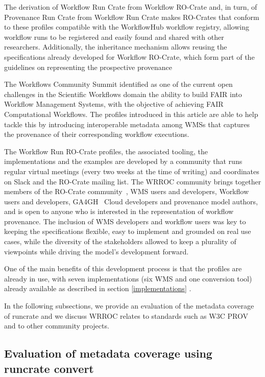 \documentclass[10pt,letterpaper]{article}
\begin{document}
The derivation of Workflow Run Crate from Workflow RO-Crate and, in turn, of Provenance Run Crate from Workflow Run Crate makes RO-Crates that conform to these profiles compatible with the WorkflowHub workflow registry, allowing workflow runs to be registered and easily found and shared with other researchers. Additionally, the inheritance mechanism allows reusing the specifications already developed for Workflow RO-Crate, which form part of the guidelines on representing the prospective provenance

The Workflows Community Summit \cite{Ferreira 2023} identified as one of the current open challenges in the Scientific Workflows domain the ability to build FAIR into Workflow Management Systems, with the objective of achieving FAIR Computational Workflows. The profiles introduced in this article are able to help tackle this by introducing interoperable metadata among WMSs that captures the provenance of their corresponding workflow executions.

The Workflow Run RO-Crate profiles, the associated tooling, the implementations and the examples are developed by a community that runs regular virtual meetings (every two weeks at the time of writing) and coordinates on Slack and the RO-Crate mailing list.
The WRROC community brings together members of the RO-Crate community~\cite{Soiland-Reyes 2022a}, WMS users and developers, Workflow users and developers, GA4GH~\cite{Rehm 2021} Cloud developers and provenance model authors, and is open to anyone who is interested in the representation of workflow provenance.
The inclusion of WMS developers and workflow users was key to keeping the specifications flexible, easy to implement and grounded on real use cases, while the diversity of the stakeholders allowed to keep a plurality of viewpoints while driving the model's development forward.

One of the main benefits of this development process is that the profiles are already in use, with seven implementations (six WMS and one conversion tool) already available as described in section \ref{implementations} .

In the following subsections, we provide an evaluation of the metadata coverage of runcrate and we discuss WRROC relates to standards such as W3C PROV and to other community projects.


\subsection{Evaluation of metadata coverage using runcrate convert}
\end{document}
